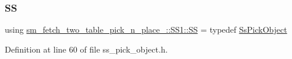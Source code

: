 \subsubsection{\texorpdfstring{SS}{SS}}
{\footnotesize\ttfamily using \hyperlink{namespacesm__fetch__two__table__pick__n__place__1_1_1SS1_a7d071fc321ab48aa1ba1f23ae142aae4}{sm\+\_\+fetch\+\_\+two\+\_\+table\+\_\+pick\+\_\+n\+\_\+place\+\_\+::\+S\+S1\+::\+SS} = typedef \hyperlink{structsm__fetch__two__table__pick__n__place__1_1_1SS1_1_1SsPickObject}{Ss\+Pick\+Object}}



Definition at line 60 of file ss\+\_\+pick\+\_\+object.\+h.

